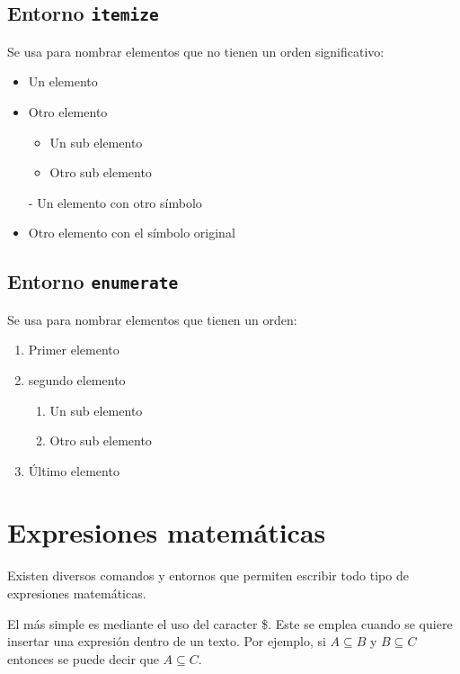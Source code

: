 \documentclass[a4paper,12pt]{article}
\begin{document}
\subsection{Entorno \texttt{itemize}}\label{sub:itemize}

Se usa para nombrar elementos que no tienen un orden significativo:

\begin{itemize}
    \item Un elemento
    \item Otro elemento
    \begin{itemize}
        \item Un sub elemento
        \item Otro sub elemento
    \end{itemize}
    \item[-] Un elemento con otro símbolo
    \item Otro elemento con el símbolo original
\end{itemize}

\subsection{Entorno \texttt{enumerate}}\label{sub:enumerate}

Se usa para nombrar elementos que tienen un orden:

\begin{enumerate}
    \item Primer elemento
    \item segundo elemento
    \begin{enumerate}
        \item Un sub elemento
        \item Otro sub elemento
    \end{enumerate}
    \item Último elemento
\end{enumerate}

\section{Expresiones matemáticas}\label{sec:math}

Existen diversos comandos y entornos que permiten escribir todo tipo de
expresiones matemáticas.

El más simple es mediante el uso del caracter \$. Este se emplea cuando se
quiere insertar una expresión dentro de un texto. Por ejemplo, si $A \subseteq
B$ y $B \subseteq C$ entonces se puede decir que $A \subseteq C$.
\end{document}
